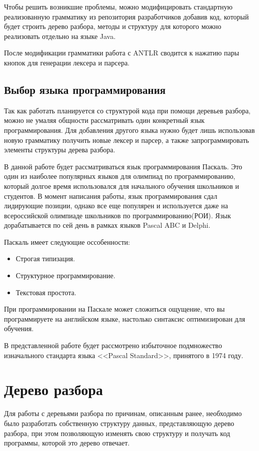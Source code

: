 Чтобы решить возникшие проблемы, можно модифицировать стандартную реализованную грамматику из репозитория разработчиков
добавив код, который будет строить дерево разбора, методы и структуру для которого можно реализовать отдельно на языке
Java.

После модификации грамматики работа с ANTLR сводится к нажатию пары кнопок для генерации лексера и парсера. 

\subsection{Выбор языка программирования}

Так как работать планируется со структурой кода при помощи деревьев разбора, можно не умаляя общности рассматривать один
конкретный язык программирования. Для добавления другого языка нужно будет лишь использовав новую грамматику получить новые лексер
и парсер, а также запрограммировать элементы структуры дерева разбора.

В данной работе будет рассматриваться язык программирования Паскаль. Это один из наиболее популярных языков для олимпиад
по программированию, который долгое время использовался для начального обучения школьников и студентов. В момент написания
работы, язык программирования сдал лидирующие позиции, однако все еще популярен и используется даже на всероссийской олимпиаде
школьников по программированию(РОИ). Язык дорабатывается по сей день в рамках языков Pascal ABC и Delphi.

Паскаль имеет следующие оссобенности:
\begin{itemize}
    \item Строгая типизация.
    \item Структурное программирование.
    \item Текстовая простота.
\end{itemize}

При программировании на Паскале может сложиться ощущение, что вы программируете на английском языке, настолько синтаксис оптимизирован
для обучения.


В представленной работе будет рассмотрено избыточное подмножество изначального стандарта языка 
<<Pascal Standard>>, принятого в 1974 году.

\section{Дерево разбора}

Для работы с деревьями разбора по причинам, описанным ранее, необходимо было разработать собственную структуру данных, представляющую
дерево разбора, при этом позволяющую изменять свою структуру и получать код программы, которой это дерево отвечает.

